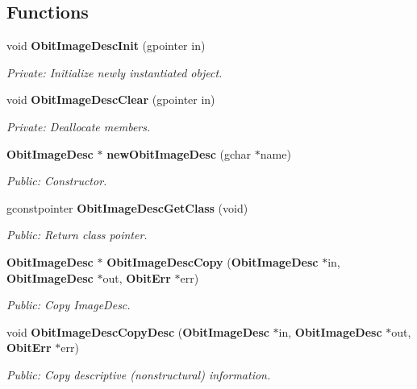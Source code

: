 \subsection*{Functions}
\begin{CompactItemize}
\item 
void {\bf Obit\-Image\-Desc\-Init} (gpointer in)
\begin{CompactList}\small\item\em Private: Initialize newly instantiated object. \item\end{CompactList}\item 
void {\bf Obit\-Image\-Desc\-Clear} (gpointer in)
\begin{CompactList}\small\item\em Private: Deallocate members. \item\end{CompactList}\item 
{\bf Obit\-Image\-Desc} $\ast$ {\bf new\-Obit\-Image\-Desc} (gchar $\ast$name)
\begin{CompactList}\small\item\em Public: Constructor. \item\end{CompactList}\item 
gconstpointer {\bf Obit\-Image\-Desc\-Get\-Class} (void)
\begin{CompactList}\small\item\em Public: Return class pointer. \item\end{CompactList}\item 
{\bf Obit\-Image\-Desc} $\ast$ {\bf Obit\-Image\-Desc\-Copy} ({\bf Obit\-Image\-Desc} $\ast$in, {\bf Obit\-Image\-Desc} $\ast$out, {\bf Obit\-Err} $\ast$err)
\begin{CompactList}\small\item\em Public: Copy Image\-Desc. \item\end{CompactList}\item 
void {\bf Obit\-Image\-Desc\-Copy\-Desc} ({\bf Obit\-Image\-Desc} $\ast$in, {\bf Obit\-Image\-Desc} $\ast$out, {\bf Obit\-Err} $\ast$err)
\begin{CompactList}\small\item\em Public: Copy descriptive (nonstructural) information. \item\end{CompactList}\item 

\end{CompactItemize}
